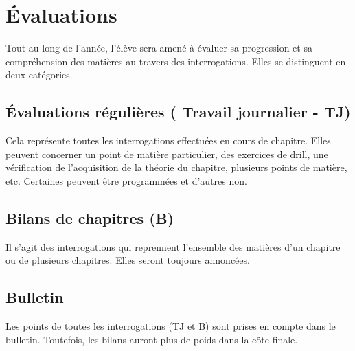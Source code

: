 \documentclass[parskip=half-, numbers=enddot]{scrartcl}
\begin{document}
\section{Évaluations}

Tout au long de l'année, l'élève sera amené à évaluer sa progression et
sa compréhension des matières au travers des interrogations. Elles se
distinguent en deux catégories.

\subsection{Évaluations régulières ( Travail journalier - TJ)}

Cela représente toutes les interrogations effectuées en cours de
chapitre. Elles peuvent concerner un point de matière particulier, des
exercices de drill, une vérification de l'acquisition de la théorie du chapitre, plusieurs points de matière, etc. Certaines peuvent être
programmées et d'autres non.

\subsection{Bilans de chapitres (B)}

Il s'agit des interrogations qui reprennent l'ensemble des matières d'un chapitre ou de plusieurs chapitres. Elles seront toujours annoncées.

\subsection{Bulletin}
Les points de toutes les interrogations (TJ et B) sont prises en compte dans le bulletin. Toutefois, les bilans auront plus de poids dans la côte finale.


 
\end{document}
